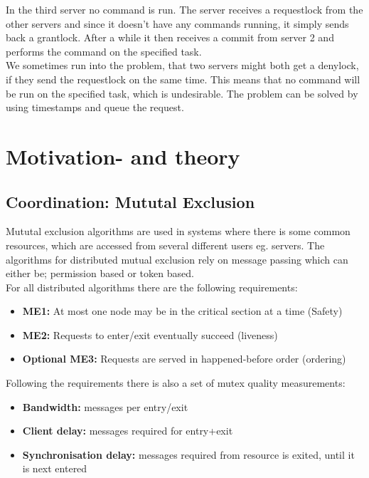 In the third server no command is run. The server receives a requestlock from the other servers and since it doesn’t have any commands running, it simply sends back a grantlock. After a while it then receives a commit from server 2 and performs the command on the specified task. \\

We sometimes run into the problem, that two servers might both get a denylock, if they send the requestlock on the same time. This means that no command will be run on the specified task, which is undesirable. The problem can be solved by using timestamps and queue the request.

\section{Motivation- and theory}
\label{MutualExclusion_motivation}

\subsection{Coordination: Mututal Exclusion}
Mututal exclusion algorithms are used in systems where there is some common resources, which are accessed from several different users eg. servers. The algorithms for distributed mutual exclusion rely on message passing which can either be; permission based or token based. \\

For all distributed algorithms there are the following requirements:
\begin{itemize}
\item \textbf{ME1:} At most one node may be in the critical section at a time (Safety)
\item \textbf{ME2:} Requests to enter/exit eventually succeed 
(liveness)
\item \textbf{Optional ME3:} Requests are served in happened-before 
order (ordering)
\end{itemize} 

Following the requirements there is also a set of mutex quality measurements:
\begin{itemize}
\item \textbf{Bandwidth:} messages per entry/exit
\item \textbf{Client delay:} messages required for entry+exit
\item \textbf{Synchronisation delay:} messages required from resource is exited, until it is next entered
\end{itemize}

